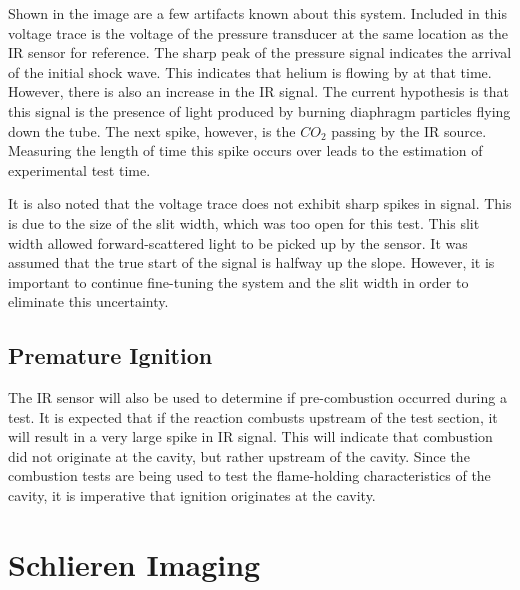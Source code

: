 Shown in the image are a few artifacts known about this system. Included in this voltage trace is the voltage of the pressure transducer at the same location as the IR sensor for reference. The sharp peak of the pressure signal indicates the arrival of the initial shock wave. This indicates that helium is flowing by at that time. However, there is also an increase in the IR signal. The current hypothesis is that this signal is the presence of light produced by burning diaphragm particles flying down the tube. The next spike, however, is the $CO_2$ passing by the IR source. Measuring the length of time this spike occurs over leads to the estimation of experimental test time. 

It is also noted that the voltage trace does not exhibit sharp spikes in signal. This is due to the size of the slit width, which was too open for this test. This slit width allowed forward-scattered light to be picked up by the sensor. It was assumed that the true start of the signal is halfway up the slope. However, it is important to continue fine-tuning the system and the slit width in order to eliminate this uncertainty.

\subsection{Premature Ignition}

The IR sensor will also be used to determine if pre-combustion occurred during a test. It is expected that if the reaction combusts upstream of the test section, it will result in a very large spike in IR signal. This will indicate that combustion did not originate at the cavity, but rather upstream of the cavity. Since the combustion tests are being used to test the flame-holding characteristics of the cavity, it is imperative that ignition originates at the cavity. 



\section{Schlieren Imaging}

